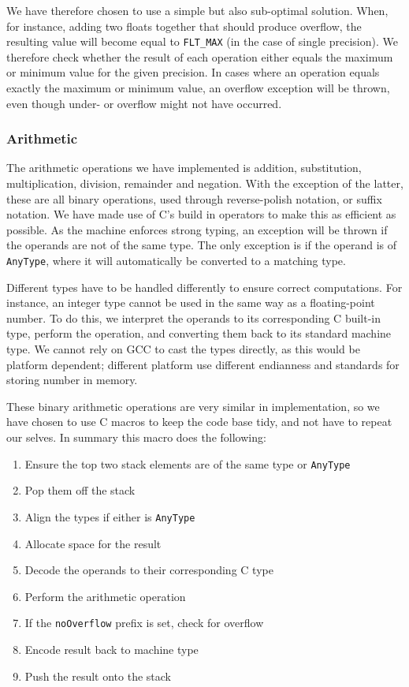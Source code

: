 We have therefore chosen to use a simple but also sub-optimal solution. When,
for instance, adding two floats together that should produce overflow, the
resulting value will become equal to {\tt FLT\_MAX} (in the case of single
precision). We therefore check whether the result of each operation either
equals the maximum or minimum value for the given precision. In cases where an
operation equals exactly the maximum or minimum value, an overflow exception
will be thrown, even though under- or overflow might not have occurred.

\subsubsection{Arithmetic}

The arithmetic operations we have implemented is addition, substitution,
multiplication, division, remainder and negation. With the exception of the
latter, these are all binary operations, used through reverse-polish notation,
or suffix notation. We have made use of C's build in operators to make this as
efficient as possible. As the machine enforces strong typing, an exception will
be thrown if the operands are not of the same type. The only exception is if the
operand is of {\tt AnyType}, where it will automatically be converted to a
matching type.

Different types have to be handled differently to ensure correct
computations. For instance, an integer type cannot be used in the same way as a
floating-point number. To do this, we interpret the operands to its
corresponding C built-in type, perform the operation, and converting them back
to its standard machine type. We cannot rely on GCC to cast the types directly,
as this would be platform dependent; different platform use different endianness
and standards for storing number in memory.

These binary arithmetic operations are very similar in implementation, so we
have chosen to use C macros to keep the code base tidy, and not have to repeat
our selves. In summary this macro does the following:

\begin{enumerate}
  \item Ensure the top two stack elements are of the same type or {\tt AnyType}
  \item Pop them off the stack
  \item Align the types if either is {\tt AnyType}
  \item Allocate space for the result
  \item Decode the operands to their corresponding C type
  \item Perform the arithmetic operation
  \item If the {\tt noOverflow} prefix is set, check for overflow
  \item Encode result back to machine type
  \item Push the result onto the stack
\end{enumerate}

